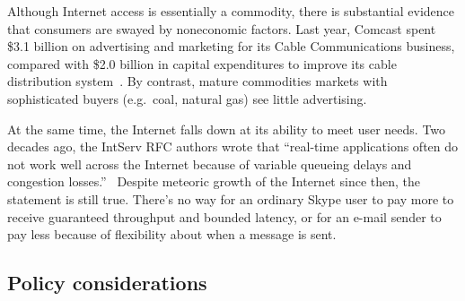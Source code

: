Although Internet access is essentially a commodity, there is
substantial evidence that consumers are swayed by noneconomic
factors. Last year, Comcast spent \$3.1 billion on advertising and
marketing for its Cable Communications business, compared with \$2.0
billion in capital expenditures to improve its cable distribution
system~\cite{comcastannualreport}. By contrast, mature commodities
markets with sophisticated buyers (e.g.~coal, natural gas) see little
advertising.

At the same time, the Internet falls down at its ability to meet user
needs. Two decades ago, the IntServ RFC authors wrote that ``real-time
applications often do not work well across the Internet because of
variable queueing delays and congestion losses.''~\cite{rfc1633}
Despite meteoric growth of the Internet since then, the statement is
still true. There's no way for an ordinary Skype user to pay more to receive
guaranteed throughput and bounded latency, or for an e-mail sender to
pay less because of flexibility about when a message is sent.

\subsection{Policy considerations}
